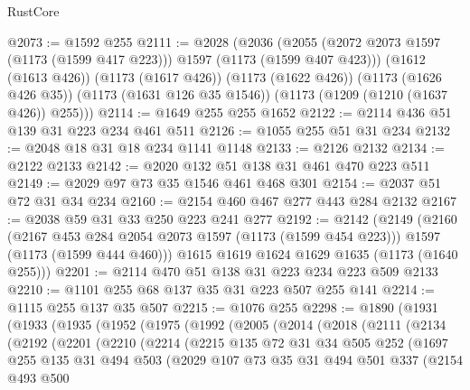 \begin{lexlean}{RustCore}
\begin{coremodule}
@2073 := @1592 @255
@2111 := @2028
    (@2036
      (@2055 (@2072 @2073 @1597 (@1173 (@1599 @417 @223))) @1597 (@1173 (@1599 @407 @423)))
      (@1612 (@1613 @426))
      (@1173 (@1617 @426))
      (@1173 (@1622 @426))
      (@1173 (@1626 @426 @35))
      (@1173 (@1631 @126 @35 @1546))
      (@1173 (@1209 (@1210 (@1637 @426)) @255)))
@2114 := @1649 @255 @255 @1652
@2122 := @2114 @436 @51 @139 @31 @223 @234 @461 @511
@2126 := @1055 @255 @51 @31 @234
@2132 := @2048 @18 @31 @18 @234 @1141 @1148
@2133 := @2126 @2132
@2134 := @2122 @2133
@2142 := @2020 @132 @51 @138 @31 @461 @470 @223 @511
@2149 := @2029 @97 @73 @35 @1546 @461 @468 @301
@2154 := @2037 @51 @72 @31 @34 @234
@2160 := @2154 @460 @467 @277 @443 @284 @2132
@2167 := @2038 @59 @31 @33 @250 @223 @241 @277
@2192 := @2142
    (@2149
      (@2160
        (@2167 @453 @284 @2054 @2073 @1597 (@1173 (@1599 @454 @223)))
        @1597
        (@1173 (@1599 @444 @460)))
      @1615
      @1619
      @1624
      @1629
      @1635
      (@1173 (@1640 @255)))
@2201 := @2114 @470 @51 @138 @31 @223 @234 @223 @509 @2133
@2210 := @1101 @255 @68 @137 @35 @31 @223 @507 @255 @141
@2214 := @1115 @255 @137 @35 @507
@2215 := @1076 @255
@2298 := @1890
    (@1931
      (@1933
        (@1935
          (@1952
            (@1975
              (@1992
                (@2005
                  (@2014
                    (@2018
                      (@2111
                        (@2134
                          (@2192
                            (@2201
                              (@2210
                                (@2214
                                  (@2215
                                    @135
                                    @72
                                    @31
                                    @34
                                    @505
                                    @252
                                    (@1697
                                      @255
                                      @135
                                      @31
                                      @494
                                      @503
                                      (@2029
                                        @107
                                        @73
                                        @35
                                        @31
                                        @494
                                        @501
                                        @337
                                        (@2154
                                          @493
                                          @500

\end{coremodule}
\end{lexlean}
